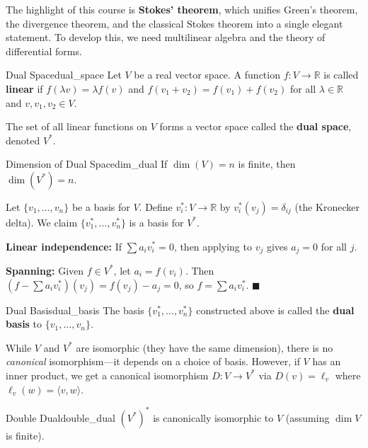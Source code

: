 \documentclass[11pt, letterpaper, openany]{book}
\renewenvironment{proof}[1][\proofname]{%
  \tcolorbox[blanker, breakable, left=1em,
    before skip=1em, after skip=1em,
    borderline west={2pt}{0pt}{MagicTeal!50},
    colback=MagicCream,
    before upper={\textcolor{MagicTeal}{\sffamily\bfseries #1.}\space}
  ]%
}{%
  \hfill\textcolor{MagicTeal}{\ensuremath{\blacksquare}}\endtcolorbox%
}
\begin{document}
The highlight of this course is \textbf{Stokes' theorem}, which unifies Green's theorem, the divergence theorem, and the classical Stokes theorem into a single elegant statement. To develop this, we need multilinear algebra and the theory of differential forms.

\begin{defn}{Dual Space}{dual_space}
Let $V$ be a real vector space. A function $f: V \to \mathbb{R}$ is called \textbf{linear} if $f(\lambda v) = \lambda f(v)$ and $f(v_1 + v_2) = f(v_1) + f(v_2)$ for all $\lambda \in \mathbb{R}$ and $v, v_1, v_2 \in V$.

The set of all linear functions on $V$ forms a vector space called the \textbf{dual space}, denoted $V^*$.
\end{defn}

\begin{thm}{Dimension of Dual Space}{dim_dual}
If $\dim(V) = n$ is finite, then $\dim(V^*) = n$.
\end{thm}

\begin{proof}
Let $\{v_1, \ldots, v_n\}$ be a basis for $V$. Define $v_i^*: V \to \mathbb{R}$ by $v_i^*(v_j) = \delta_{ij}$ (the Kronecker delta). We claim $\{v_1^*, \ldots, v_n^*\}$ is a basis for $V^*$.

\textbf{Linear independence:} If $\sum a_i v_i^* = 0$, then applying to $v_j$ gives $a_j = 0$ for all $j$.

\textbf{Spanning:} Given $f \in V^*$, let $a_i = f(v_i)$. Then $(f - \sum a_i v_i^*)(v_j) = f(v_j) - a_j = 0$, so $f = \sum a_i v_i^*$.
\end{proof}

\begin{defn}{Dual Basis}{dual_basis}
The basis $\{v_1^*, \ldots, v_n^*\}$ constructed above is called the \textbf{dual basis} to $\{v_1, \ldots, v_n\}$.
\end{defn}

\begin{remark}
While $V$ and $V^*$ are isomorphic (they have the same dimension), there is no \emph{canonical} isomorphism---it depends on a choice of basis. However, if $V$ has an inner product, we get a canonical isomorphism $D: V \to V^*$ via $D(v) = \ell_v$ where $\ell_v(w) = \langle v, w \rangle$.
\end{remark}

\begin{thm}{Double Dual}{double_dual}
$(V^*)^*$ is canonically isomorphic to $V$ (assuming $\dim V$ is finite).
\end{thm}
\end{document}
